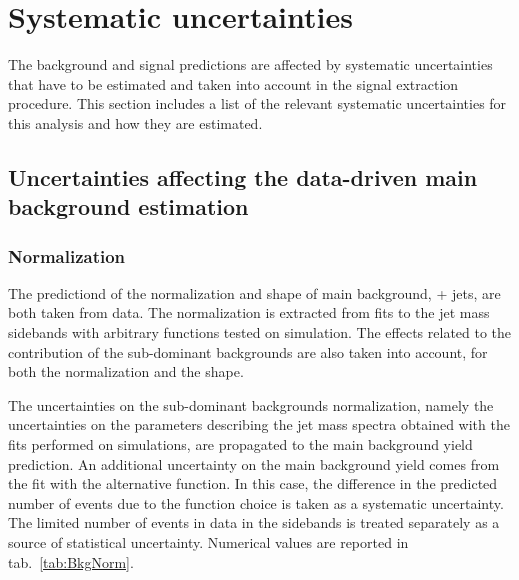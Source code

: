 \section{Systematic uncertainties}
\label{sec:uncertainties}

The background and signal predictions are affected by systematic uncertainties that have to be estimated and taken into account in the signal extraction procedure. This section includes a list of the relevant systematic uncertainties for this analysis and how they are estimated.%


\subsection{Uncertainties affecting the data-driven main background estimation}

\subsubsection{Normalization}

The predictiond of the normalization and shape of main background, \V + jets, are both taken from data. The normalization is extracted from fits to the jet mass sidebands with arbitrary functions tested on simulation. The effects related to the contribution of the sub-dominant backgrounds are also taken into account, for both the normalization and the shape.

\noindent The uncertainties on the sub-dominant backgrounds normalization, namely the uncertainties on the parameters describing the jet mass spectra obtained with the fits performed on simulations, are propagated to the main background yield prediction. An additional uncertainty on the main background yield comes from the fit with the alternative function. In this case, the difference in the predicted number of events due to the function choice is taken as a systematic uncertainty. The limited number of events in data in the sidebands is treated separately as a source of statistical uncertainty. Numerical values are reported in tab.~\ref{tab:BkgNorm}.



